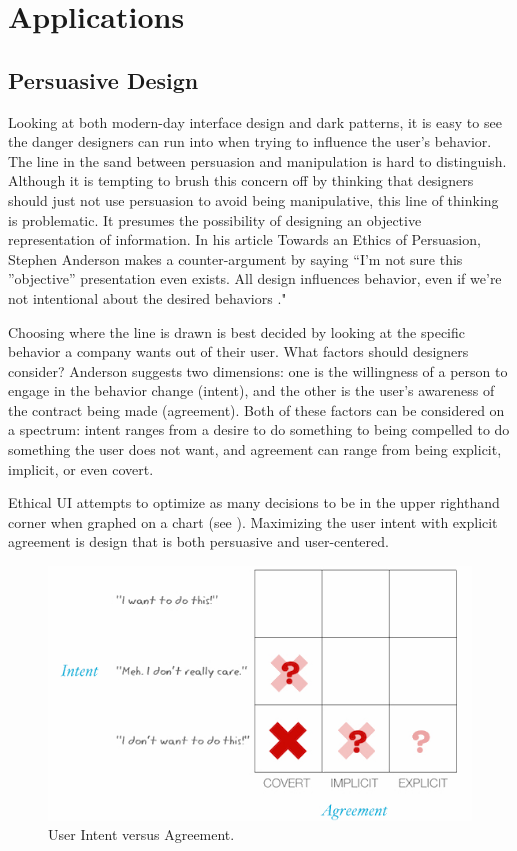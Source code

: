 \documentclass[12pt, oneside]{article}
\begin{document}
\section{Applications}

\subsection{Persuasive Design}

Looking at both modern-day interface design and dark patterns, it is easy to see the danger designers can run into when trying to influence the user's behavior. The line in the sand between persuasion and manipulation is hard to distinguish. Although it is tempting to brush this concern off by thinking that designers should just not use persuasion to avoid being manipulative, this line of thinking is problematic. It presumes the possibility of designing an objective representation of information. In his article Towards an Ethics of Persuasion, Stephen Anderson makes a counter-argument by saying ``I’m not sure this ''objective” presentation even exists. All design influences behavior, even if we’re not intentional about the desired behaviors \cite{anderson_2011}."

Choosing where the line is drawn is best decided by looking at the specific behavior a company wants out of their user. What factors should designers consider? Anderson suggests two dimensions: one is the willingness of a person to engage in the behavior change (intent), and the other is the user's awareness of the contract being made (agreement). Both of these factors can be considered on a spectrum: intent ranges from a desire to do something to being compelled to do something the user does not want, and agreement can range from being explicit, implicit, or even covert.

Ethical UI attempts to optimize as many decisions to be in the upper righthand corner when graphed on a chart (see \cite[Fig. \ref{fig:model}]{anderson_2011}). Maximizing the user intent with explicit agreement is design that is both persuasive and user-centered.

\begin{figure}[ht]
  \includegraphics[width=\linewidth]{Resources/model.jpg}
  \caption{User Intent versus Agreement.}
  \label{fig:model}
\end{figure}
\end{document}
